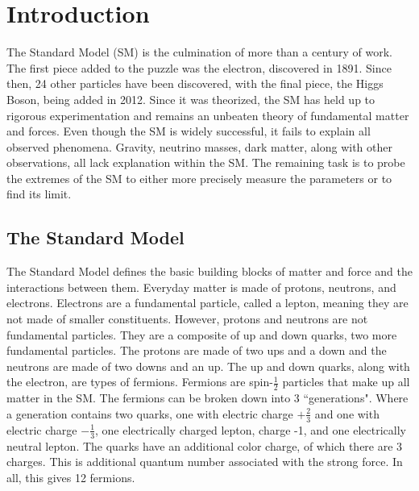 \chapter{Introduction}
The Standard Model (SM) is the culmination of more than a century of work. The first piece added to the puzzle was the electron, discovered in 1891. Since then, 24 other particles have been discovered, with the final piece, the Higgs Boson, being added in 2012. Since it was theorized, the SM has held up to rigorous experimentation and remains an unbeaten theory of fundamental matter and forces. Even though the SM is widely successful, it fails to explain all observed phenomena. Gravity, neutrino masses, dark matter, along with other observations, all lack explanation within the SM. The remaining task is to probe the extremes of the SM to either more precisely measure the parameters or to find its limit.
\section{The Standard Model}
The Standard Model defines the basic building blocks of matter and force and the interactions between them. Everyday matter is made of protons, neutrons, and electrons. Electrons are a fundamental particle, called a lepton, meaning they are not made of smaller constituents. However, protons and neutrons are not fundamental particles. They are a composite of up and down quarks, two more fundamental particles. The protons are made of two ups and a down and the neutrons are made of two downs and an up. The up and down quarks, along with the electron, are types of fermions. \linebreak
\indent Fermions are spin-${\frac{1}{2}}$ particles that make up all matter in the SM. The fermions can be broken down into 3 ``generations". Where a generation contains two quarks, one with electric charge ${+\frac{2}{3}}$ and one with electric charge ${-\frac{1}{3}}$, one electrically charged lepton, charge -1, and one electrically neutral lepton. The quarks have an additional color charge, of which there are 3 charges. This is additional quantum number associated with the strong force. In all, this gives 12 fermions. \linebreak 

